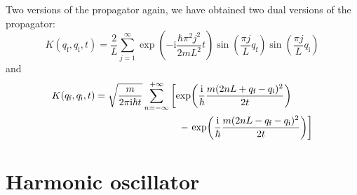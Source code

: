 \documentclass[t,dvipsnames]{beamer}
\begin{document}
\begin{frame}[t]{Two versions of the propagator}
 again, we have obtained two dual versions of the propagator:
 \begin{displaymath}
  K(q_\text{f}, q_\text{i}, t) = \frac{2}{L}\sum_{j=1}^{\infty}
    \exp\left(-\text{i}\frac{\hbar\pi^2j^2}{2mL^2}t\right)
	 \sin\!\left(\frac{\pi j}{L}q_\text{f}\right)
	 \sin\!\left(\frac{\pi j}{L}q_\text{i}\right)
 \end{displaymath}
 and
 \begin{displaymath}
  \begin{aligned}
   K(q_\text{f}, q_\text{i}, t) &= \sqrt{\frac{m}{2\pi\text{i}\hbar t}}\sum_{n=-\infty}^{+\infty}
    \left[\exp\!\left(\frac{\text{i}}{\hbar}
	  \frac{m(2nL+q_\text{f}-q_\text{i})^2}{2t}\right)\right.\\
    &\hspace{3truecm}-\left.\exp\!\left(\frac{\text{i}}{\hbar}
	  \frac{m(2nL-q_\text{f}-q_\text{i})^2}{2t}\right)\right]
  \end{aligned}
 \end{displaymath}

 \vspace{0.2truecm}
 \begin{center}
 \end{center}
\end{frame}

\section{Harmonic oscillator}

\begin{frame}[c]{}
 \begin{center}
  \begin{minipage}{0.8\textwidth}
   \tableofcontents[currentsection]
  \end{minipage}
 \end{center}
\end{frame}
\end{document}

